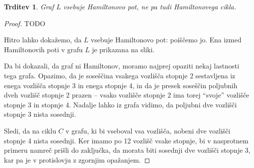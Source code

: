 \documentclass[12pt,a4paper]{amsart}
\theoremstyle{definition} %
\theoremstyle{plain} %
\newtheorem{trditev}[definicija]{Trditev}
\begin{document}
\bigskip

\begin{trditev}
    Graf $L$ vsebuje Hamiltonovo pot, ne pa tudi Hamiltonovega cikla.
\end{trditev}

\begin{proof}
    TODO
    
    Hitro lahko dokažemo, da $L$ vsebuje Hamiltonovo pot: poiščemo jo. Ena izmed Hamiltonovih poti v grafu $L$ je prikazana na sliki.
    
    Da bi dokazali, da graf ni Hamiltonov, moramo najprej opaziti nekaj lastnosti tega grafa. Opazimo, da je soseščina vsakega vozlišča stopnje 2 sestavljena iz enega vozlišča stopnje 3 in enega stopnje 4, in da je presek soseščin poljubnih dveh vozlišč stopnje 2 prazen -- vsako vozlišče stopnje 2 ima torej ``svoje'' vozlišče stopnje 3 in stopnje 4. Nadalje lahko iz grafa vidimo, da poljubni dve vozlišči stopnje 3 nista sosednji.
    
    Sledi, da na ciklu $C$ v grafu, ki bi vseboval vsa vozlišča, nobeni dve vozlišči stopnje 4 nista sosednji. Ker imamo po 12 vozlišč vsake stopnje, bi v nasprotnem primeru namreč prišli do zaključka, da morata biti sosednji dve vozlišči stopnje 3, kar pa je v protislovju z zgornjim opažanjem.
    

\end{proof}
\end{document}
